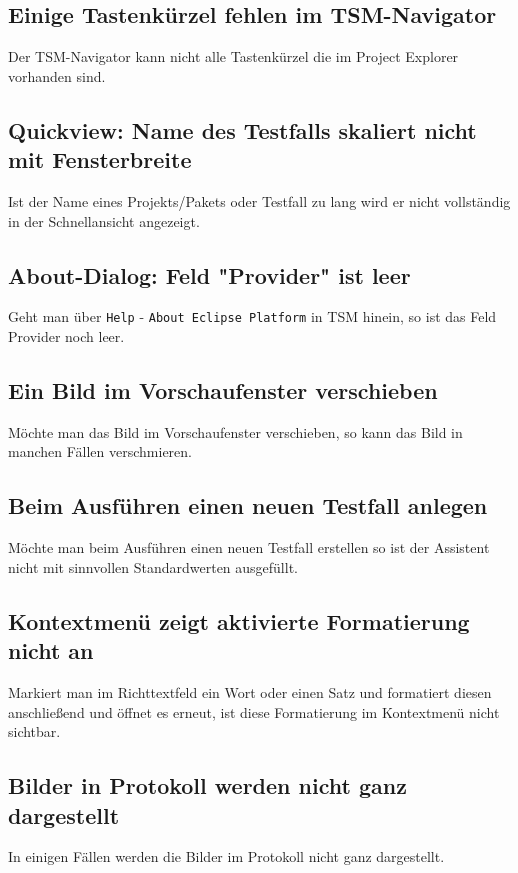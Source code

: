 \documentclass[11pt,a4paper,titlepage]{article}
\begin{document}
\subsection*{Einige Tastenkürzel fehlen im TSM-Navigator}
Der TSM-Navigator kann nicht alle Tastenkürzel die im Project Explorer vorhanden sind.

\subsection*{Quickview: Name des Testfalls skaliert nicht mit Fensterbreite}
Ist der Name eines Projekts/Pakets oder Testfall zu lang wird er nicht vollständig in der Schnellansicht angezeigt.

\subsection*{About-Dialog: Feld "Provider" ist leer}
Geht man über \texttt{Help} - \texttt{About Eclipse Platform} in TSM hinein, so ist das Feld Provider noch leer.

\subsection*{Ein Bild im Vorschaufenster verschieben}
Möchte man das Bild im Vorschaufenster verschieben, so kann das Bild in manchen Fällen verschmieren.

\subsection*{Beim Ausführen einen neuen Testfall anlegen}
Möchte man beim Ausführen einen neuen Testfall erstellen so ist der Assistent nicht mit sinnvollen Standardwerten ausgefüllt.

\subsection*{Kontextmenü zeigt aktivierte Formatierung nicht an}
Markiert man im Richttextfeld ein Wort oder einen Satz und formatiert diesen anschließend und öffnet es erneut, ist diese Formatierung im Kontextmenü nicht sichtbar.

\subsection*{Bilder in Protokoll werden nicht ganz dargestellt}
In einigen Fällen werden die Bilder im Protokoll nicht ganz dargestellt.
\end{document}
